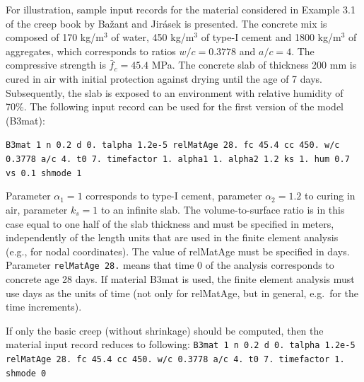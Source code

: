 \documentclass[a4paper]{article}
\begin{document}
For illustration, sample input records for the material considered in Example 3.1 of the creep
book by Ba\v{z}ant and Jir\'{a}sek is presented. The concrete mix is composed
of 170 kg/m$^3$ of water, 450 kg/m$^3$ of type-I cement and 1800 kg/m$^3$ of aggregates,
which corresponds to ratios $w/c=0.3778$ and $a/c=4$. The compressive strength 
is $\bar{f}_c=45.4$ MPa. The concrete slab of thickness 200 mm is cured in air
with initial protection against drying until the age of 7 days.
Subsequently, the slab is exposed to an environment with
relative humidity of 70\%. The following input record can be used for the first
version of the model (B3mat):

{\tt B3mat 1 n 0.2 d 0. talpha 1.2e-5 relMatAge 28. fc 45.4 cc 450. w/c 0.3778 a/c 4. t0 7. timefactor 1. alpha1 1. alpha2 1.2 ks 1. hum 0.7 vs 0.1 shmode 1}

Parameter $\alpha_1=1$ corresponds to type-I cement, parameter $\alpha_2=1.2$
to curing in air, parameter $k_s=1$ to an infinite slab. 
The volume-to-surface ratio is in this case 
equal to one half of the slab thickness
and must be specified in meters, independently of the length units that are
used in the finite element analysis (e.g., for nodal coordinates).
The value of relMatAge must be specified in days.
Parameter {\tt relMatAge 28.}  means that time 0
of the analysis corresponds to concrete age 28 days. 
If material B3mat is used, the finite element analysis
must use days as the units of time (not only for relMatAge,
but in general, e.g.\ for the time increments).

If only the basic creep (without shrinkage) should be computed, then
the material input record reduces to following:
{\tt B3mat 1 n 0.2 d 0. talpha 1.2e-5 relMatAge 28. fc 45.4 cc 450. w/c 0.3778 a/c 4. t0 7. timefactor 1. shmode 0}



\end{document}
